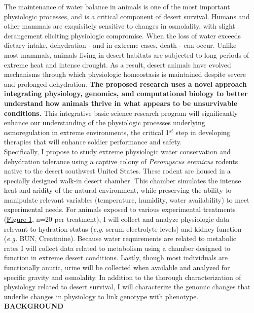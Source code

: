 \documentclass[12pt]{article}
\begin{document}
The maintenance of water balance in animals is one of the most important physiologic processes, and is a critical component of desert survival. Humans and other mammals are exquisitely sensitive to changes in osmolality, with slight derangement eliciting physiologic compromise.  When the loss of water exceeds dietary intake, dehydration - and in extreme cases, death - can occur.  Unlike most mammals, animals living in desert habitats are subjected to long periods of extreme heat and intense drought.  As a result, desert animals have evolved mechanisms through which physiologic homeostasis is maintained despite severe and prolonged dehydration. \textbf{The proposed research uses a novel approach integrating physiology, genomics, and computational biology to better understand how animals thrive in what appears to be unsurvivable conditions.} This integrative basic science research program will significantly enhance our understanding of the physiologic processes underlying osmoregulation in extreme environments, the critical 1$^{st}$ step in developing therapies that will enhance soldier performance and safety.\\

Specifically, I propose to study extreme physiologic water conservation and dehydration tolerance using a captive colony of \textit{Peromyscus eremicus} rodents native to the desert southwest United States. These rodent are housed in a specially designed walk-in desert chamber. This chamber simulates the intense heat and aridity of the natural environment, while preserving the ability to manipulate relevant variables (temperature, humidity, water availability) to meet experimental needs. For animals exposed to various experimental treatments (\hyperlink{Figure 1}{Figure 1}, n=20 per treatment), I will collect and analyze physiologic data relevant to hydration status (\textit{e.g.} serum electrolyte levels) and kidney function (\textit{e.g.} BUN, Creatinine). Because water requirements are related to metabolic rates I will collect data related to metabolism using a chamber designed to function in extreme desert conditions. Lastly, though most individuals are functionally anuric, urine will be collected when available and analyzed for specific gravity and osmolality. In addition to the thorough characterization of physiology related to desert survival, I will characterize the genomic changes that underlie changes in physiology to link genotype with phenotype. \\

\noindent \textbf{BACKGROUND} \\
\end{document}
